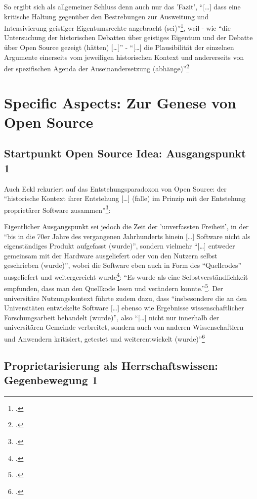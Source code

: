 \documentclass[DIV=calc,BCOR=5mm,11pt,headings=small,oneside,abstract=true, toc=bib]{scrartcl}
\begin{document}
So ergibt sich als allgemeiner Schluss denn auch nur das 'Fazit',
\enquote{[\ldots] dass eine kritische Haltung gegenüber den Bestrebungen
zur Ausweitung und Intensivierung geistiger Eigentumsrechte angebracht
(sei)}\footcite[vgl.][139]{Eckl2004a}, weil - wie \enquote{die
Untersuchung der historischen Debatten über geistiges Eigentum und der
Debatte über Open Source gezeigt (hätten) [\ldots]} - \enquote{[\ldots]
die Plausibilität der einzelnen Argumente einerseits vom jeweiligen
historischen Kontext und andererseits von der spezifischen Agenda der
Auseinandersetzung (abhänge)}\footcite[vgl.][140]{Eckl2004a}

\section{Specific Aspects: Zur Genese von Open Source}

\subsection{Startpunkt Open Source Idea: Ausgangspunkt 1}

Auch Eckl rekuriert auf das Entstehungsparadoxon von Open Source: der
\enquote{historische Kontext ihrer Entstehung [\ldots] (falle) im Prinzip
mit der Entstehung proprietärer Software
zusammen}\footcite[vgl.][102]{Eckl2004a}:

Eigentlicher Ausgangspunkt sei jedoch die Zeit der 'unverfassten Freiheit', in
der \enquote{bis in die 70er Jahre des vergangenen Jahrhunderts hinein [\ldots]
Software nicht als eigenständiges Produkt aufgefasst (wurde)}, sondern
vielmehr \enquote{[\ldots] entweder gemeinsam mit der Hardware ausgeliefert oder
von den Nutzern selbst geschrieben (wurde)}, wobei die Software eben auch
in Form des \enquote{Quellcodes} ausgeliefert und weitergereicht
wurde\footcite[vgl.][102]{Eckl2004a}: \enquote{Es wurde als eine
Selbstverständlichkeit empfunden, dass man den Quellkode lesen und verändern
konnte.}\footcite[][102]{Eckl2004a}. Der universitäre Nutzungskontext
führte zudem dazu, dass \enquote{insbesondere die an den Universitäten
entwickelte Software [\ldots] ebenso wie Ergebnisse wissenschaftlicher
Forschungsarbeit behandelt (wurde)}, also \enquote{[\ldots] nicht nur
innerhalb der universitären Gemeinde verbreitet, sondern auch von
anderen Wissenschaftlern und Anwendern kritisiert, getestet und
weiterentwickelt (wurde)}\footcite[vgl.][102]{Eckl2004a}

\subsection{Proprietarisierung als Herrschaftswissen: Gegenbewegung 1}
\end{document}
